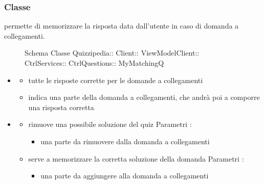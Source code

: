 \subsubsection{Classe }
permette di memorizzare la risposta data dall'utente in caso di domanda a collegamenti.
\begin{figure}[H]
\centering
\noindent{}
\caption[Schema Classe MyMatchingQ]{Schema Classe Quizzipedia:: Client:: ViewModelClient:: CtrlServices:: CtrlQuestions:: MyMatchingQ}
\end{figure}
\begin{itemize}
\item {}
\begin{itemize}
\item {}
\newline
tutte le risposte corrette per le domande a collegamenti
\item {}
\newline
indica una parte della domanda a collegamenti, che andrà poi a comporre una risposta corretta
\end{itemize}
\item {}
\begin{itemize}
\item {}
\newline
rimuove una possibile soluzione del quiz
\newline
Parametri :
\begin{itemize}
\item {}
\newline
una parte da rimuovere dalla domanda a collegamenti
\end{itemize}
\item {}
\newline
serve a memorizzare la corretta soluzione della domanda
\newline
Parametri :
\begin{itemize}
\item {}
\newline
una parte da aggiungere alla domanda a collegamenti
\end{itemize}
\end{itemize}
\end{itemize}
